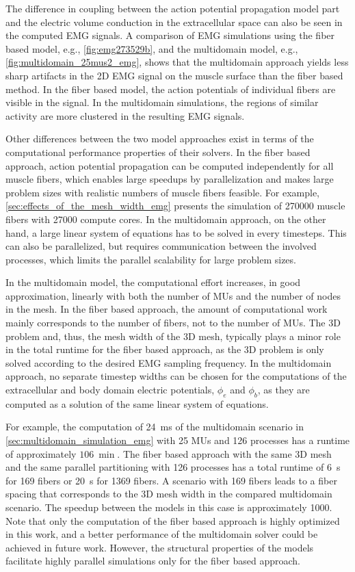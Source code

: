 The difference in coupling between the action potential propagation model part and the electric volume conduction in the extracellular space can also be seen in the computed EMG signals. A comparison of EMG simulations using the fiber based model, e.g., \cref{fig:emg273529b}, and the multidomain model, e.g., \cref{fig:multidomain_25mus2_emg}, shows that the multidomain approach yields less sharp artifacts in the 2D EMG signal on the muscle surface than the fiber based method. In the fiber based model, the action potentials of individual fibers are visible in the signal. In the multidomain simulations, the regions of similar activity are more clustered in the resulting EMG signals.

Other differences between the two model approaches exist in terms of the computational performance properties of their solvers. In the fiber based approach, action potential propagation can be computed independently for all muscle fibers, which enables large speedups by parallelization and makes large problem sizes with realistic numbers of muscle fibers feasible. For example, \cref{sec:effects_of_the_mesh_width_emg} presents the simulation of \num{270000} muscle fibers with \num{27000} compute cores.
In the multidomain approach, on the other hand, a large linear system of equations has to be solved in every timesteps. This can also be parallelized, but requires communication between the involved processes, which limits the parallel scalability for large problem sizes.

In the multidomain model, the computational effort increases, in good approximation, linearly with both the number of MUs and the number of nodes in the mesh. In the fiber based approach, the amount of computational work mainly corresponds to the number of fibers, not to the number of MUs. 
The 3D problem and, thus, the mesh width of the 3D mesh, typically plays a minor role in the total runtime for the fiber based approach, as the 3D problem is only solved according to the desired EMG sampling frequency. In the multidomain approach, no separate timestep widths can be chosen for the computations of the extracellular and body domain electric potentials, $\phi_e$ and $\phi_b$, as they are computed as a solution of the same linear system of equations.

For example, the computation of \SI{24}{\ms} of the multidomain scenario in \cref{sec:multidomain_simulation_emg} with 25 MUs and 126 processes has a runtime of approximately $\SI{106}{\min}$. The fiber based approach with the same 3D mesh and the same parallel partitioning with 126 processes has a total runtime of \SI{6}{\s} for 169 fibers or \SI{20}{\s} for 1369 fibers. A scenario with 169 fibers leads to a fiber spacing that corresponds to the 3D mesh width in the compared multidomain scenario. The speedup between the models in this case is approximately \num{1000}.
Note that only the computation of the fiber based approach is highly optimized in this work, and a better performance of the multidomain solver could be achieved in future work. However, the structural properties of the models facilitate highly parallel simulations only for the fiber based approach.

